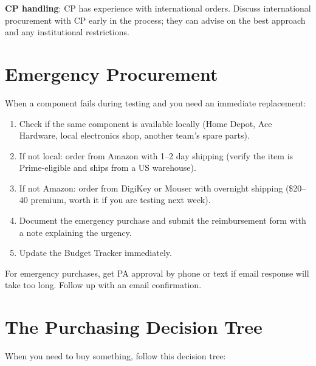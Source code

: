\textbf{CP handling}: CP has experience with international orders. Discuss international procurement with CP early in the process; they can advise on the best approach and any institutional restrictions.

\section{Emergency Procurement}
When a component fails during testing and you need an immediate replacement:

\begin{enumerate}[nosep,leftmargin=1.5em]
\item Check if the same component is available locally (Home Depot, Ace Hardware, local electronics shop, another team's spare parts).
\item If not local: order from Amazon with 1--2 day shipping (verify the item is Prime-eligible and ships from a US warehouse).
\item If not Amazon: order from DigiKey or Mouser with overnight shipping (\$20--40 premium, worth it if you are testing next week).
\item Document the emergency purchase and submit the reimbursement form with a note explaining the urgency.
\item Update the Budget Tracker immediately.
\end{enumerate}

For emergency purchases, get PA approval by phone or text if email response will take too long. Follow up with an email confirmation.



\section{The Purchasing Decision Tree}
When you need to buy something, follow this decision tree:

